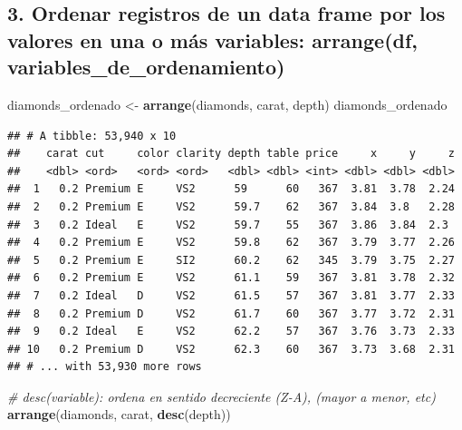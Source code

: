 \documentclass[]{book}
\newenvironment{Shaded}{\begin{snugshade}}{\end{snugshade}}
\newcommand{\KeywordTok}[1]{\textcolor[rgb]{0.13,0.29,0.53}{\textbf{#1}}}
\newcommand{\StringTok}[1]{\textcolor[rgb]{0.31,0.60,0.02}{#1}}
\newcommand{\CommentTok}[1]{\textcolor[rgb]{0.56,0.35,0.01}{\textit{#1}}}
\newcommand{\NormalTok}[1]{#1}
\theoremstyle{definition}
\theoremstyle{definition}
\theoremstyle{definition}
\theoremstyle{remark}
\begin{document}
\subsection{3. Ordenar registros de un data frame por los valores en una
o más variables: arrange(df,
variables\_de\_ordenamiento)}\label{ordenar-registros-de-un-data-frame-por-los-valores-en-una-o-mas-variables-arrangedf-variables_de_ordenamiento}

\begin{Shaded}
\begin{Highlighting}[]
\NormalTok{diamonds_ordenado <-}\StringTok{ }\KeywordTok{arrange}\NormalTok{(diamonds, carat, depth)}
\NormalTok{diamonds_ordenado}
\end{Highlighting}
\end{Shaded}

\begin{verbatim}
## # A tibble: 53,940 x 10
##    carat cut     color clarity depth table price     x     y     z
##    <dbl> <ord>   <ord> <ord>   <dbl> <dbl> <int> <dbl> <dbl> <dbl>
##  1   0.2 Premium E     VS2      59      60   367  3.81  3.78  2.24
##  2   0.2 Premium E     VS2      59.7    62   367  3.84  3.8   2.28
##  3   0.2 Ideal   E     VS2      59.7    55   367  3.86  3.84  2.3 
##  4   0.2 Premium E     VS2      59.8    62   367  3.79  3.77  2.26
##  5   0.2 Premium E     SI2      60.2    62   345  3.79  3.75  2.27
##  6   0.2 Premium E     VS2      61.1    59   367  3.81  3.78  2.32
##  7   0.2 Ideal   D     VS2      61.5    57   367  3.81  3.77  2.33
##  8   0.2 Premium D     VS2      61.7    60   367  3.77  3.72  2.31
##  9   0.2 Ideal   E     VS2      62.2    57   367  3.76  3.73  2.33
## 10   0.2 Premium D     VS2      62.3    60   367  3.73  3.68  2.31
## # ... with 53,930 more rows
\end{verbatim}

\begin{Shaded}
\begin{Highlighting}[]
\CommentTok{# desc(variable): ordena en sentido decreciente (Z-A), (mayor a menor, etc)}
\KeywordTok{arrange}\NormalTok{(diamonds, carat, }\KeywordTok{desc}\NormalTok{(depth))}
\end{Highlighting}
\end{Shaded}
\end{document}
